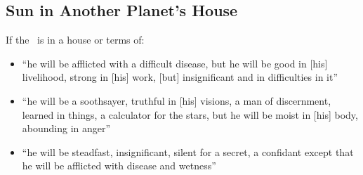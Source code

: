 \subsection{Sun in Another Planet's House}
If the \Sun\, is in a house or terms of:
\begin{itemize}[topsep=0em,itemsep=0em]
\item[\Mars] ``he will be afflicted with a difficult disease, but he will be good in [his] livelihood, strong in [his] work, [but] insignificant and in difficulties in it''

\item[\Venus] ``he will be a soothsayer, truthful in [his] visions, a man of discernment, learned in things, a calculator for the stars, but he will be moist in [his] body, abounding in anger''

\item[\Mercury] ``he will be steadfast, insignificant, silent for a secret, a confidant except that he will be afflicted with disease and wetness''
\end{itemize}